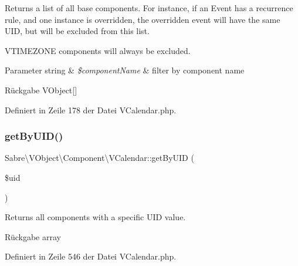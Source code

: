 Returns a list of all \textquotesingle{}base components\textquotesingle{}. For instance, if an Event has a recurrence rule, and one instance is overridden, the overridden event will have the same U\+ID, but will be excluded from this list.

V\+T\+I\+M\+E\+Z\+O\+NE components will always be excluded.


\begin{DoxyParams}[1]{Parameter}
string & {\em \$component\+Name} & filter by component name\\
\hline
\end{DoxyParams}
\begin{DoxyReturn}{Rückgabe}
V\+Object\mbox{[}\mbox{]} 
\end{DoxyReturn}


Definiert in Zeile 178 der Datei V\+Calendar.\+php.

\mbox{\label{class_sabre_1_1_v_object_1_1_component_1_1_v_calendar_a694f8253fe4066b08c02b594ce7901c7}} 
\subsubsection{\texorpdfstring{get\+By\+U\+I\+D()}{getByUID()}}
{\footnotesize\ttfamily Sabre\textbackslash{}\+V\+Object\textbackslash{}\+Component\textbackslash{}\+V\+Calendar\+::get\+By\+U\+ID (\begin{DoxyParamCaption}\item[{}]{\$uid }\end{DoxyParamCaption})}

Returns all components with a specific U\+ID value.

\begin{DoxyReturn}{Rückgabe}
array 
\end{DoxyReturn}


Definiert in Zeile 546 der Datei V\+Calendar.\+php.

\mbox{\label{class_sabre_1_1_v_object_1_1_component_1_1_v_calendar_a2653f373e72648003c2435a92a609fcb}} 
